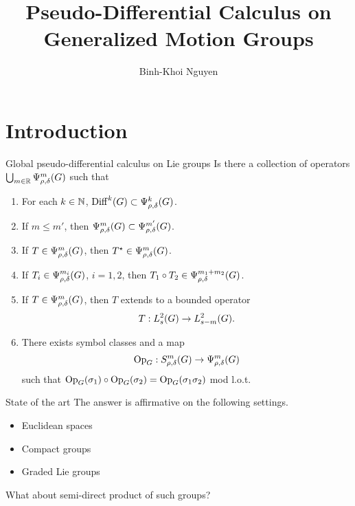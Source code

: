 \documentclass[handout]{beamer}
\title{Pseudo-Differential Calculus on Generalized Motion Groups}
\author{Binh-Khoi Nguyen}
\begin{document}
\maketitle

\section{Introduction}

\begin{frame}{Global pseudo-differential calculus on Lie groups}
    Is there a collection of operators $\bigcup_{m \in \mathbb{R}} \Psi^{m}_{\rho, \delta}(G)$ such that
    \begin{enumerate}
        \item
            For each $k \in \mathbb{N}$,
            $\mathrm{Diff}^k(G) \subset \Psi^{k}_{\rho, \delta}(G)$.
        \item
            If $m \leq m'$,
            then $\Psi^{m}_{\rho, \delta}(G) \subset \Psi^{m'}_{\rho, \delta}(G)$.
        \item
            If $T \in \Psi^{m}_{\rho, \delta}(G)$, then ${T}^\star \in \Psi^{m}_{\rho, \delta}(G)$.
        \item
            If $T_i \in \Psi^{m_i}_{\rho, \delta}(G)$, $i = 1, 2$,
            then $T_1 \circ T_2 \in \Psi^{m_1 + m_2}_{\rho, \delta}(G)$.
        \item
            If $T \in \Psi^{m}_{\rho, \delta}(G)$,
            then $T$ extends to a bounded operator
            \begin{align*}
                T : L^2_{s}(G) \to L^2_{s - m}(G).
            \end{align*}
        \item There exists symbol classes and a map
            \begin{align*}
                \mathrm{Op}_{G} : S^{m}_{\rho, \delta}(G) \to \Psi^{m}_{\rho, \delta}(G)
            \end{align*}
            such that
            $\mathrm{Op}_{G} (\sigma_1) \circ \mathrm{Op}_{G}(\sigma_2) = \mathrm{Op}_{G} (\sigma_1 \sigma_2)$
            mod l.o.t.
    \end{enumerate}
\end{frame}

\begin{frame}{State of the art}
    The answer is affirmative on the following settings.

    \begin{itemize}
        \item Euclidean spaces
        \item Compact groups \cite{RuzhanskyTurunen10}
        \item Graded Lie groups \cite{FischerRuzhansky16}
    \end{itemize}

    What about semi-direct product of such groups?
\end{frame}
\end{document}
